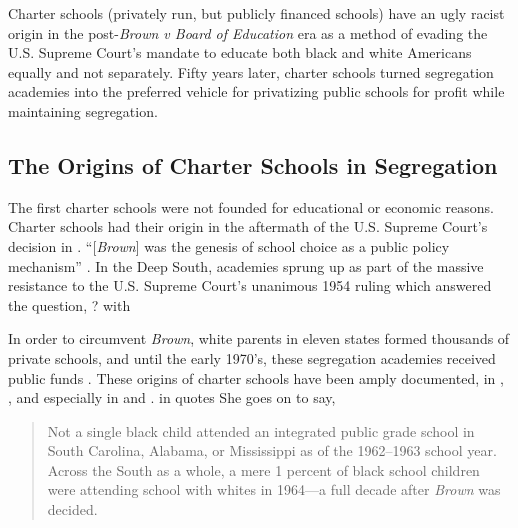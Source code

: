 Charter schools (privately run, but publicly financed schools) have an ugly racist origin in the post-\textit{Brown v Board of Education} era as a method of evading the U.S. Supreme Court's mandate to educate both black and white Americans equally and not separately. Fifty years later, charter schools turned segregation academies into the preferred vehicle for privatizing public schools for profit while maintaining segregation.

\newpage
\subsection{The Origins of Charter Schools in Segregation}\label{sec:origins}\indent

The first charter schools were not founded for educational or economic reasons. Charter schools had their origin in the aftermath of the U.S. Supreme Court's decision in \textcite{Warren1954}. ``[\textit{Brown}] was the genesis of school choice as a public policy mechanism'' \parencite[8]{Garcia2018}. In the Deep South, academies sprung up as part of the massive resistance to the U.S. Supreme Court's unanimous 1954 ruling which answered the question,
?
with  %

In order to circumvent \textit{Brown}, white parents in eleven states formed thousands of private schools, and until the early 1970's, these segregation academies received public funds \parencite[81]{Rooks2017}. These origins of  charter schools have been amply documented, in \textcite{Frankenberg.etal2010}, \textcite{Frankenberg.etal2011}, and especially in \textcite{Suitts2019} and \textcite{Suitts2020}. \citeauthor{Alexander2011} in  quotes \textcite[52]{Rosenberg1991}  She goes on to say,
\blockquote[{\parencite[235]{Alexander2011}}][]{\SingleSpacing\vspace{-0.5\baselineskip}%
Not a single black child attended an integrated public grade school in South Carolina, Alabama, or Mississippi as of the 1962–1963 school year. Across the South as a whole, a mere 1 percent of black school children were attending school with whites in 1964—a full decade after \textit{Brown} was decided.}

